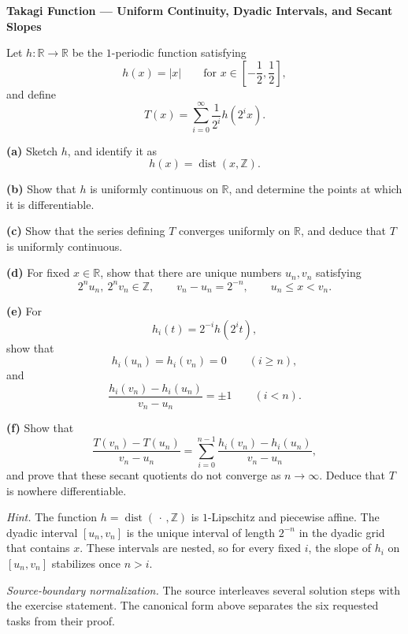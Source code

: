 \begin{problem}[CP-II-0129]
\label{prob:cp-ii-0129}
\textbf{Takagi Function --- Uniform Continuity, Dyadic Intervals, and Secant Slopes}

\hspace*{1.5em}Let \(h:\mathbb R\to\mathbb R\) be the \(1\)-periodic function satisfying
\[
h(x)=|x|
\qquad
\text{for }x\in\left[-\frac12,\frac12\right],
\]
and define
\[
T(x)
=
\sum_{i=0}^{\infty}
\frac1{2^i}h(2^i x).
\]

\par\smallskip\noindent\textbf{(a)}\quad
Sketch \(h\), and identify it as
\[
h(x)=\operatorname{dist}(x,\mathbb Z).
\]

\par\smallskip\noindent\textbf{(b)}\quad
Show that \(h\) is uniformly continuous on \(\mathbb R\), and determine
the points at which it is differentiable.

\par\smallskip\noindent\textbf{(c)}\quad
Show that the series defining \(T\) converges uniformly on \(\mathbb R\),
and deduce that \(T\) is uniformly continuous.

\par\smallskip\noindent\textbf{(d)}\quad
For fixed \(x\in\mathbb R\), show that there are unique numbers
\(u_n,v_n\) satisfying
\[
2^n u_n,\ 2^n v_n\in\mathbb Z,
\qquad
v_n-u_n=2^{-n},
\qquad
u_n\le x<v_n.
\]

\par\smallskip\noindent\textbf{(e)}\quad
For
\[
h_i(t)=2^{-i}h(2^i t),
\]
show that
\[
h_i(u_n)=h_i(v_n)=0
\qquad(i\ge n),
\]
and
\[
\frac{h_i(v_n)-h_i(u_n)}{v_n-u_n}
=
\pm1
\qquad(i<n).
\]

\par\smallskip\noindent\textbf{(f)}\quad
Show that
\[
\frac{T(v_n)-T(u_n)}{v_n-u_n}
=
\sum_{i=0}^{n-1}
\frac{h_i(v_n)-h_i(u_n)}{v_n-u_n},
\]
and prove that these secant quotients do not converge as \(n\to\infty\).
Deduce that \(T\) is nowhere differentiable.

\medskip
\noindent\emph{Hint.} The function \(h=\operatorname{dist}(\,\cdot\,,\mathbb Z)\) is
\(1\)-Lipschitz and piecewise affine. The dyadic interval
\([u_n,v_n]\) is the unique interval of length \(2^{-n}\) in the dyadic
grid that contains \(x\). These intervals are nested, so for every fixed
\(i\), the slope of \(h_i\) on \([u_n,v_n]\) stabilizes once \(n>i\).

\medskip
\noindent\textit{Source-boundary normalization.}
The source interleaves several solution steps with the exercise statement.
The canonical form above separates the six requested tasks from their proof.
\end{problem}

